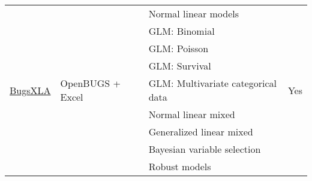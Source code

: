 \begin{table}[!ht]
{{\begin{tabular}{|l|l|l|c|}
     \hline
\multirow{9}{*}{ \href{http://www.philwoodward.co.uk/bugsxla/}{BugsXLA}}                                         & \multirow{9}{*}{OpenBUGS + Excel} & Normal linear models                                                         & \multirow{9}{*}{Yes}                                               \\
                                                                 &                                              & GLM: Binomial                                                                &                                                                     \\
                                                                 &                                              & GLM: Poisson                                                                 &                                                                     \\
                                                                 &                                              & GLM: Survival                                                                &                                                                     \\
                                                                 &                                              & GLM: Multivariate categorical data                                           &                                                                     \\
                                                                 &                                              & Normal linear mixed                                                   &                                                                     \\
                                                                 &                                              & Generalized linear mixed                                              &                                                                     \\
                                                                 &                                              & Bayesian variable selection                                                  &                                                                     \\
                                                                 &                                              & Robust models                                                                &                                                                     \\ \hline

\end{tabular}}}
\end{table}
